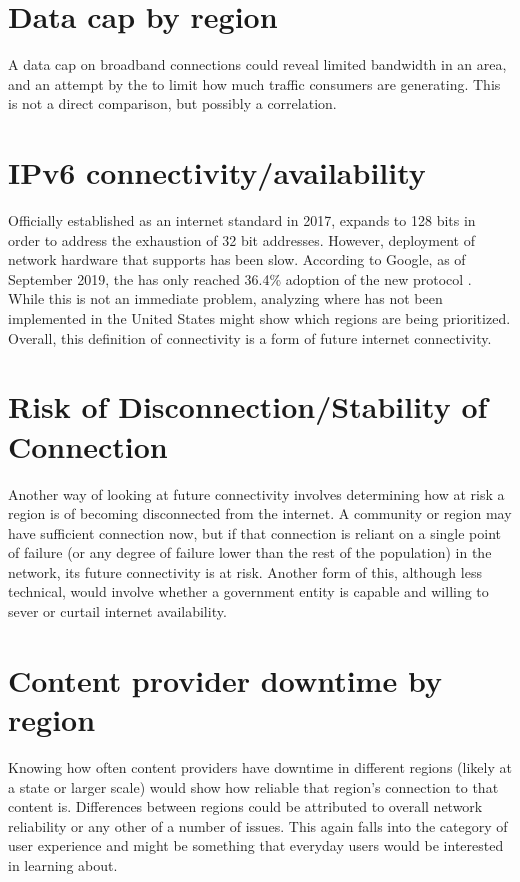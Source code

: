 \section{Data cap by region}

A data cap on broadband connections could reveal limited bandwidth in an area, and an attempt by the \isp to limit how much traffic consumers are generating. This is not a direct comparison, but possibly a correlation.

\section{IPv6 connectivity/availability}

Officially established as an internet standard in 2017, \ipvs expands \ipvf to 128 bits in order to address the exhaustion of 32 bit \ipvf addresses. However, deployment of network hardware that supports \ipvs has been slow. According to Google, as of September 2019, the \us has only reached 36.4\% adoption of the new protocol \cite{Google2019a}. While this is not an immediate problem, analyzing where \ipvs has not been implemented in the United States might show which regions are being prioritized. Overall, this definition of connectivity is a form of future internet connectivity.

\section{Risk of Disconnection/Stability of Connection}
Another way of looking at future connectivity involves determining how at risk a region is of becoming disconnected from the internet. A community or region may have sufficient connection now, but if that connection is reliant on a single point of failure (or any degree of failure lower than the rest of the population) in the network, its future connectivity is at risk. Another form of this, although less technical, would involve whether a government entity is capable and willing to sever or curtail internet availability.

\section{Content provider downtime by region}

Knowing how often content providers have downtime in different regions (likely at a state or larger scale) would show how reliable that region's connection to that content is. Differences between regions could be attributed to overall network reliability or any other of a number of issues. This again falls into the category of user experience and might be something that everyday users would be interested in learning about.

